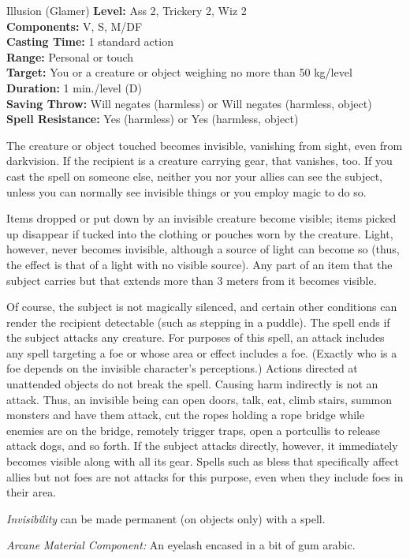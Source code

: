 {Illusion (Glamer)}
{
	\textbf{Level:}
	Ass 2, Trickery 2, Wiz 2\\
	\textbf{Components:}
	V, S, M/DF\\
	\textbf{Casting Time:}
	1 standard action\\
	\textbf{Range:}
	Personal or touch\\
	\textbf{Target:}
	You or a creature or object weighing no more than 50 kg/level\\
	\textbf{Duration:}
	1 min./level (D)\\
	\textbf{Saving Throw:}
	Will negates (harmless) or Will negates (harmless, object)\\
	\textbf{Spell Resistance:}
	Yes (harmless) or Yes (harmless, object)\\
}
{
	The creature or object touched becomes invisible, vanishing from sight, even from darkvision. If the recipient is a creature carrying gear, that vanishes, too. If you cast the spell on someone else, neither you nor your allies can see the subject, unless you can normally see invisible things or you employ magic to do so.

	Items dropped or put down by an invisible creature become visible; items picked up disappear if tucked into the clothing or pouches worn by the creature. Light, however, never becomes invisible, although a source of light can become so (thus, the effect is that of a light with no visible source). Any part of an item that the subject carries but that extends more than 3 meters from it becomes visible.

	Of course, the subject is not magically silenced, and certain other conditions can render the recipient detectable (such as stepping in a puddle). The spell ends if the subject attacks any creature. For purposes of this spell, an attack includes any spell targeting a foe or whose area or effect includes a foe. (Exactly who is a foe depends on the invisible character's perceptions.) Actions directed at unattended objects do not break the spell. Causing harm indirectly is not an attack. Thus, an invisible being can open doors, talk, eat, climb stairs, summon monsters and have them attack, cut the ropes holding a rope bridge while enemies are on the bridge, remotely trigger traps, open a portcullis to release attack dogs, and so forth. If the subject attacks directly, however, it immediately becomes visible along with all its gear. Spells such as bless that specifically affect allies but not foes are not attacks for this purpose, even when they include foes in their area.

	\emph{Invisibility} can be made permanent (on objects only) with a  spell.

	\textit{Arcane Material Component:}
	An eyelash encased in a bit of gum arabic.

}
